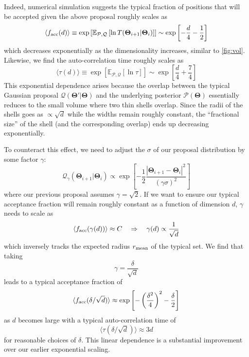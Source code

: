 \documentclass[12pt, titlepage]{article}
\newcommand{\meanwrt}[2]{\ensuremath{\mathbb{E}_{{#2}}\left[{#1}\right]}}
\newcommand{\params}{\ensuremath{\boldsymbol\Theta}}
\newcommand{\posterior}{\ensuremath{\mathcal{P}}}
\newcommand{\proposal}{\ensuremath{\mathcal{Q}}}
\begin{document}
Indeed, numerical simulation suggests
the typical fraction of positions that will be accepted given the above proposal
roughly scales as
\begin{equation}
    \langle f_{\rm acc}(d) \rangle
    \equiv \exp\left[\meanwrt{\ln T(\params_{i+1}|\params_i)}
    {\posterior,\proposal}\right]
    \sim \exp\left[-\frac{d}{4} - \frac{1}{2}\right]
\end{equation}
which decreases exponentially as the dimensionality increases,
similar to {\color{red} \autoref{fig:vol}}. Likewise, we find
the auto-correlation time roughly scales as
\begin{equation}
    \langle \tau(d) \rangle 
    \equiv \exp\left[\meanwrt{\ln \tau}
    {\posterior,\proposal}\right]
    \sim \exp\left[\frac{d}{4} + \frac{7}{4}\right]
\end{equation}
This exponential dependence
arises because the overlap between the typical Gaussian proposal
$\proposal(\params'|\params)$ and the underlying posterior 
$\posterior(\params)$ essentially reduces to the small volume
where two thin shells overlap. Since the radii of the shells
goes as $\propto \sqrt{d}$ while the widths remain roughly constant,
the ``fractional size'' of the shell (and the corresponding overlap)
ends up decreasing exponentially.

To counteract this effect, we need to adjust the $\sigma$ of our
proposal distribution by some factor $\gamma$:
\begin{equation}
    \proposal_\gamma(\params_{i+1}|\params_i)
    \propto \exp\left[-\frac{1}{2}\frac{|\params_{i+1} - \params_i|^2}
    {(\gamma\sigma)^2}\right]
\end{equation}
where our previous proposal assumes $\gamma = \sqrt{2}$.
If we want to ensure our typical acceptance fraction will remain
roughly constant as a function of dimension $d$, $\gamma$ needs to scale as
\begin{equation}
    \langle f_{\rm acc}(\gamma(d)) \rangle \approx C
    \quad \Rightarrow \quad
    \gamma(d) \propto \frac{1}{\sqrt{d}}
\end{equation}
which inversely tracks the expected radius $r_{\rm mean}$
of the typical set. We find that taking
\begin{equation}
    \gamma = \frac{\delta}{\sqrt{d}}
\end{equation}
leads to a typical acceptance fraction of
\begin{equation}
    \langle f_{\rm acc}(\delta/\sqrt{d}) \rangle
    \approx \exp\left[-\left(\frac{\delta^2}{4}\right)^{2} 
    - \frac{\delta}{2}\right]
\end{equation}
as $d$ becomes large with a typical auto-correlation time of
\begin{equation}
    \langle \tau(\delta/\sqrt{d}) \rangle \approx 3 d
\end{equation}
for reasonable choices of $\delta$.
This linear dependence is a substantial improvement over
our earlier exponential scaling.
\end{document}
